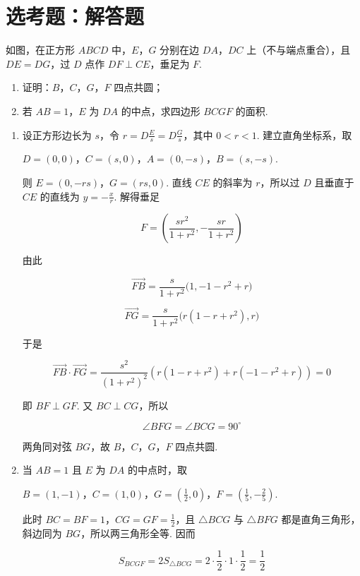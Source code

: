 \section{选考题：解答题}

\begin{problem}
如图，在正方形 \(ABCD\) 中，\(E\)，\(G\) 分别在边 \(DA\)，\(DC\) 上（不与端点重合），且 \(DE=DG\)，过 \(D\) 点作 \(DF\perp CE\)，垂足为 \(F\).
\begin{enumerate}
\item 证明：\(B\)，\(C\)，\(G\)，\(F\) 四点共圆；
\item 若 \(AB=1\)，\(E\) 为 \(DA\) 的中点，求四边形 \(BCGF\) 的面积.
\end{enumerate}

\begingroup
{}
\endgroup
\end{problem}

\begin{solution}
\begin{enumerate}
\item 设正方形边长为 \(s\)，令 \(r=D\frac{E}{s}=D\frac{G}{s}\)，其中 \(0<r<1\). 建立直角坐标系，取

\(D=(0,0)\)，\(C=(s,0)\)，\(A=(0,-s)\)，\(B=(s,-s)\).

则 \(E=(0,-rs)\)，\(G=(rs,0)\). 直线 \(CE\) 的斜率为 \(r\)，所以过 \(D\) 且垂直于 \(CE\) 的直线为 \(y=-\frac{x}{r}\). 解得垂足

\[
F=\left(\frac{sr^2}{1+r^2},-\frac{sr}{1+r^2}\right)
\]

由此

\[
\overrightarrow{FB}=\frac{s}{1+r^2}\bigl(1,-1-r^2+r\bigr)
\]

\[
\overrightarrow{FG}=\frac{s}{1+r^2}\bigl(r(1-r+r^2),r\bigr)
\]

于是

\[
\overrightarrow{FB}\cdot\overrightarrow{FG}
=\frac{s^2}{(1+r^2)^2}\left(r(1-r+r^2)+r(-1-r^2+r)\right)=0
\]

即 \(BF\perp GF\). 又 \(BC\perp CG\)，所以

\[
\angle BFG=\angle BCG=90^\circ
\]

两角同对弦 \(BG\)，故 \(B\)，\(C\)，\(G\)，\(F\) 四点共圆.

\item 当 \(AB=1\) 且 \(E\) 为 \(DA\) 的中点时，取

\(B=(1,-1)\)，\(C=(1,0)\)，\(G=\left(\frac12,0\right)\)，\(F=\left(\frac15,-\frac25\right)\).

此时 \(BC=BF=1\)，\(CG=GF=\frac{1}{2}\)，且 \(\triangle BCG\) 与 \(\triangle BFG\) 都是直角三角形，斜边同为 \(BG\)，所以两三角形全等. 因而

\[
S_{BCGF}=2S_{\triangle BCG}=2\cdot\frac12\cdot1\cdot\frac12=\frac12
\]
\end{enumerate}
\end{solution}


